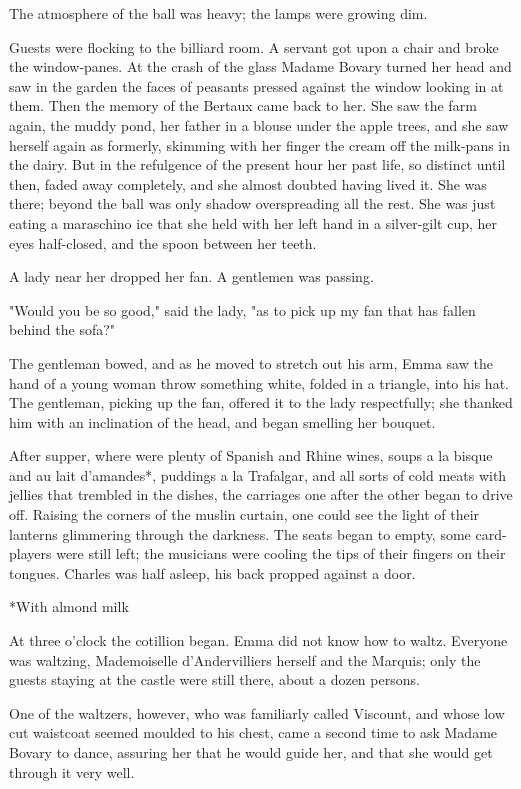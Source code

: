 \documentclass[11pt,twocolumn]{ltugboat}
\begin{document}
The atmosphere of the ball was heavy; the lamps were growing dim.

Guests were flocking to the billiard room. A servant got upon a chair
and broke the window-panes. At the crash of the glass Madame Bovary
turned her head and saw in the garden the faces of peasants pressed
against the window looking in at them. Then the memory of the Bertaux
came back to her. She saw the farm again, the muddy pond, her father in
a blouse under the apple trees, and she saw herself again as formerly,
skimming with her finger the cream off the milk-pans in the dairy. But
in the refulgence of the present hour her past life, so distinct until
then, faded away completely, and she almost doubted having lived it. She
was there; beyond the ball was only shadow overspreading all the rest.
She was just eating a maraschino ice that she held with her left hand
in a silver-gilt cup, her eyes half-closed, and the spoon between her
teeth.

A lady near her dropped her fan. A gentlemen was passing.

"Would you be so good," said the lady, "as to pick up my fan that has
fallen behind the sofa?"

The gentleman bowed, and as he moved to stretch out his arm, Emma saw
the hand of a young woman throw something white, folded in a triangle,
into his hat. The gentleman, picking up the fan, offered it to the lady
respectfully; she thanked him with an inclination of the head, and began
smelling her bouquet.

After supper, where were plenty of Spanish and Rhine wines, soups a la
bisque and au lait d'amandes*, puddings a la Trafalgar, and all sorts of
cold meats with jellies that trembled in the dishes, the carriages one
after the other began to drive off. Raising the corners of the muslin
curtain, one could see the light of their lanterns glimmering through
the darkness. The seats began to empty, some card-players were still
left; the musicians were cooling the tips of their fingers on their
tongues. Charles was half asleep, his back propped against a door.

     *With almond milk

At three o'clock the cotillion began. Emma did not know how to waltz.
Everyone was waltzing, Mademoiselle d'Andervilliers herself and the
Marquis; only the guests staying at the castle were still there, about a
dozen persons.

One of the waltzers, however, who was familiarly called Viscount, and
whose low cut waistcoat seemed moulded to his chest, came a second time
to ask Madame Bovary to dance, assuring her that he would guide her, and
that she would get through it very well.
\end{document}
